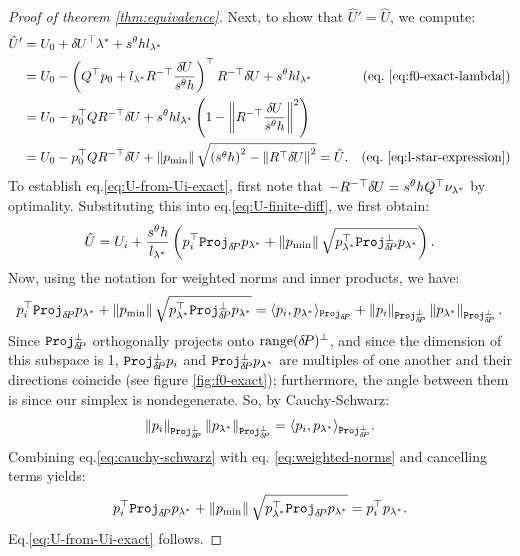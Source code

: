 \documentclass[smallcondensed]{svjour3}
\begin{document}
\begin{proof}[Proof of theorem \ref{thm:equivalence}]
  Next, to show that $\hat{U}' = \hat{U}$, we compute:
  \begin{align*}
    \hat{U}'
    &= U_0 + \delU^\top \lambda^* + s^\theta h l_{\lambda^*} & \\
    &= U_0 - \parens{Q^\top p_0 + l_{\lambda^*} R^{-\top} \frac{\delU}{s^\theta h}}^\top R^{-\top} \delU + s^\theta h l_{\lambda^*} & \mbox{(eq.\@ \ref{eq:f0-exact-lambda})} \\
    &= U_0 - p_0^\top Q R^{-\top} \delU + s^\theta h l_{\lambda^*} \parens{1 - \norm{R^{-\top} \frac{\delU}{s^\theta h}}^2} \\
    &= U_0 - p_0^\top Q R^{-\top} \delU + \norm{\pmin} \sqrt{\parens{s^\theta h}^2 - \norm{R^\top \delU}^2} = \hat{U}. & \mbox{(eq.\@ \ref{eq:l-star-expression})}
  \end{align*}
  To establish eq.\@ \ref{eq:U-from-Ui-exact}, first note that
  $-R^{-\top} {\delta \hspace{-0.09em} U} = s^\theta h Q^\top \nu_{\lambda^*}$ by
  optimality. Substituting this into eq.\@ \ref{eq:U-finite-diff},
  we first obtain:
  \begin{equation}
    \hat{U} = U_i + \frac{s^\theta h}{l_{\lambda^*}} \left(p_i^\top \mathtt{Proj}_{{\delta \hspace{-0.14em} P}} p_{\lambda^*} + \left\|p_{\operatorname{min}}\right\| \sqrt{p_{\lambda^*}^\top \mathtt{Proj}^\perp_{{\delta \hspace{-0.14em} P}} p_{\lambda^*}}\right).
  \end{equation}
  Now, using the notation for weighted norms and inner products, we have:
  \begin{equation}\label{eq:weighted-norms}
    p_i^\top \mathtt{Proj}_{{\delta \hspace{-0.14em} P}} p_{\lambda^*} + \left\|p_{\operatorname{min}}\right\| \sqrt{p_{\lambda^*}^\top \mathtt{Proj}^\perp_{{\delta \hspace{-0.14em} P}} p_{\lambda^*}} = \langle p_i, p_{\lambda^*} \rangle_{\mathtt{Proj}_{{\delta \hspace{-0.14em} P}}} + \left\|p_i\right\|_{\mathtt{Proj}^\perp_{{\delta \hspace{-0.14em} P}}} \left\|p_{\lambda^*}\right\|_{\mathtt{Proj}^\perp_{{\delta \hspace{-0.14em} P}}}.
  \end{equation}
  Since $\mathtt{Proj}^\perp_{{\delta \hspace{-0.14em} P}}$ orthogonally projects onto
  $\operatorname{range}({\delta \hspace{-0.14em} P})^\perp$, and since the dimension of this subspace is
  1, $\mathtt{Proj}^\perp_{{\delta \hspace{-0.14em} P}} p_i$ and
  $\mathtt{Proj}^\perp_{{\delta \hspace{-0.14em} P}} p_{\lambda^*}$ are multiples of one
  another and their directions coincide (see figure
  \ref{fig:f0-exact}); furthermore, the angle between them is since
  our simplex is nondegenerate. So, by Cauchy-Schwarz:
  \begin{equation}\label{eq:cauchy-schwarz}
    \left\|p_i\right\|_{\mathtt{Proj}^\perp_{{\delta \hspace{-0.14em} P}}} \left\|p_{\lambda^*}\right\|_{\mathtt{Proj}^\perp_{{\delta \hspace{-0.14em} P}}} = \langle p_i, p_{\lambda^*} \rangle_{\mathtt{Proj}^\perp_{{\delta \hspace{-0.14em} P}}}.
  \end{equation}
  Combining eq.\@ \ref{eq:cauchy-schwarz} with eq.\@
  \ref{eq:weighted-norms} and cancelling terms yields:
  \begin{equation}
    p_i^\top \mathtt{Proj}_{{\delta \hspace{-0.14em} P}} p_{\lambda^*} + \left\|p_{\operatorname{min}}\right\| \sqrt{p_{\lambda^*}^\top \mathtt{Proj}_{{\delta \hspace{-0.14em} P}} p_{\lambda^*}} = p_i^\top p_{\lambda^*}.
  \end{equation}
  Eq.\@ \ref{eq:U-from-Ui-exact} follows.


\end{proof}
\end{document}
